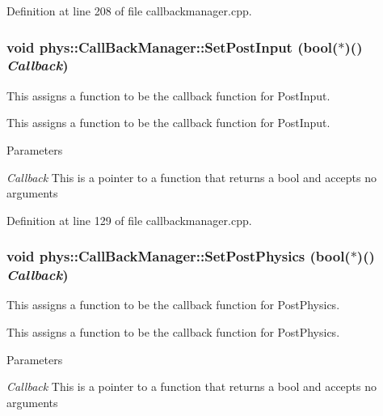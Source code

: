 Definition at line 208 of file callbackmanager.cpp.

\hypertarget{classphys_1_1CallBackManager_abbf73a7199a64d6a2a39c7de44c5acd6}{
\subsubsection[{SetPostInput}]{\setlength{\rightskip}{0pt plus 5cm}void phys::CallBackManager::SetPostInput (bool($\ast$)() {\em Callback})}}
\label{d1/d47/classphys_1_1CallBackManager_abbf73a7199a64d6a2a39c7de44c5acd6}


This assigns a function to be the callback function for PostInput. 

This assigns a function to be the callback function for PostInput. 
\begin{DoxyParams}{Parameters}
\item[{\em Callback}]This is a pointer to a function that returns a bool and accepts no arguments \end{DoxyParams}


Definition at line 129 of file callbackmanager.cpp.

\hypertarget{classphys_1_1CallBackManager_a17687cd04807dfc80a25847be830c2f2}{
\subsubsection[{SetPostPhysics}]{\setlength{\rightskip}{0pt plus 5cm}void phys::CallBackManager::SetPostPhysics (bool($\ast$)() {\em Callback})}}
\label{d1/d47/classphys_1_1CallBackManager_a17687cd04807dfc80a25847be830c2f2}


This assigns a function to be the callback function for PostPhysics. 

This assigns a function to be the callback function for PostPhysics. 
\begin{DoxyParams}{Parameters}
\item[{\em Callback}]This is a pointer to a function that returns a bool and accepts no arguments \end{DoxyParams}


